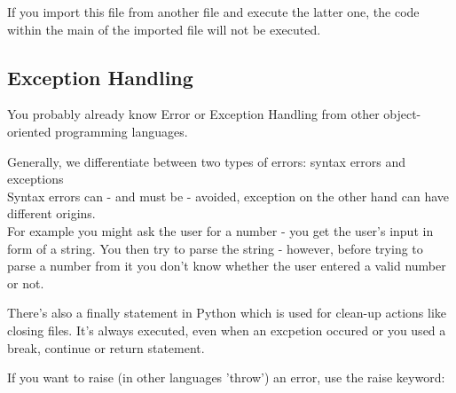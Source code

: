         If you import this file from another file and execute the latter one, the code within the
        main of the imported file will not be executed.


    \subsection{Exception Handling}
        You probably already know Error or Exception Handling from other object-oriented
        programming languages.

        Generally, we differentiate between two types of errors: syntax errors and exceptions \\
        Syntax errors can - and must be - avoided, exception on the other hand can have different
        origins. \\
        For example you might ask the user for a number - you get the user's input in form
        of a string. You then try to parse the string - however, before trying to parse a number
        from it you don't know whether the user entered a valid number or not.

        There's also a finally statement in Python which is used for clean-up actions like
        closing files. It's always executed, even when an excpetion occured or you used a break,
        continue or return statement.


        If you want to raise (in other languages 'throw') an error, use the raise keyword:
